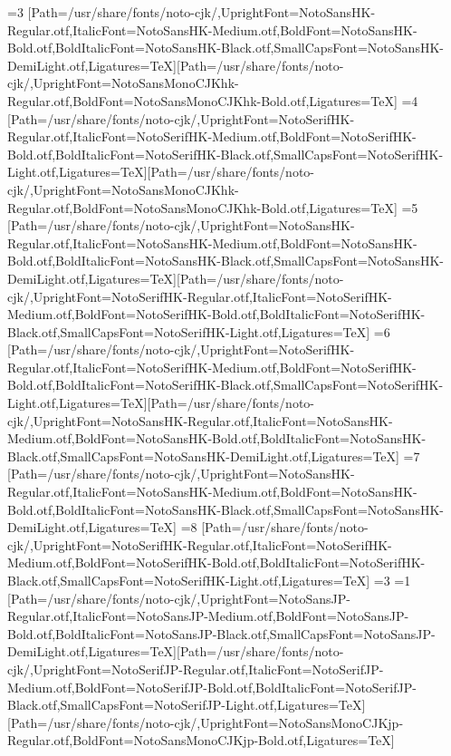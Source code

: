 \else\ifnum\value{CJKFonts}=3
[Path=/usr/share/fonts/noto-cjk/,UprightFont=NotoSansHK-Regular.otf,ItalicFont=NotoSansHK-Medium.otf,BoldFont=NotoSansHK-Bold.otf,BoldItalicFont=NotoSansHK-Black.otf,SmallCapsFont=NotoSansHK-DemiLight.otf,Ligatures=TeX][Path=/usr/share/fonts/noto-cjk/,UprightFont=NotoSansMonoCJKhk-Regular.otf,BoldFont=NotoSansMonoCJKhk-Bold.otf,Ligatures=TeX]
\else\ifnum\value{CJKFonts}=4
[Path=/usr/share/fonts/noto-cjk/,UprightFont=NotoSerifHK-Regular.otf,ItalicFont=NotoSerifHK-Medium.otf,BoldFont=NotoSerifHK-Bold.otf,BoldItalicFont=NotoSerifHK-Black.otf,SmallCapsFont=NotoSerifHK-Light.otf,Ligatures=TeX][Path=/usr/share/fonts/noto-cjk/,UprightFont=NotoSansMonoCJKhk-Regular.otf,BoldFont=NotoSansMonoCJKhk-Bold.otf,Ligatures=TeX]
\else\ifnum\value{CJKFonts}=5
[Path=/usr/share/fonts/noto-cjk/,UprightFont=NotoSansHK-Regular.otf,ItalicFont=NotoSansHK-Medium.otf,BoldFont=NotoSansHK-Bold.otf,BoldItalicFont=NotoSansHK-Black.otf,SmallCapsFont=NotoSansHK-DemiLight.otf,Ligatures=TeX][Path=/usr/share/fonts/noto-cjk/,UprightFont=NotoSerifHK-Regular.otf,ItalicFont=NotoSerifHK-Medium.otf,BoldFont=NotoSerifHK-Bold.otf,BoldItalicFont=NotoSerifHK-Black.otf,SmallCapsFont=NotoSerifHK-Light.otf,Ligatures=TeX]
\else\ifnum\value{CJKFonts}=6
[Path=/usr/share/fonts/noto-cjk/,UprightFont=NotoSerifHK-Regular.otf,ItalicFont=NotoSerifHK-Medium.otf,BoldFont=NotoSerifHK-Bold.otf,BoldItalicFont=NotoSerifHK-Black.otf,SmallCapsFont=NotoSerifHK-Light.otf,Ligatures=TeX][Path=/usr/share/fonts/noto-cjk/,UprightFont=NotoSansHK-Regular.otf,ItalicFont=NotoSansHK-Medium.otf,BoldFont=NotoSansHK-Bold.otf,BoldItalicFont=NotoSansHK-Black.otf,SmallCapsFont=NotoSansHK-DemiLight.otf,Ligatures=TeX]
\else\ifnum\value{CJKFonts}=7
[Path=/usr/share/fonts/noto-cjk/,UprightFont=NotoSansHK-Regular.otf,ItalicFont=NotoSansHK-Medium.otf,BoldFont=NotoSansHK-Bold.otf,BoldItalicFont=NotoSansHK-Black.otf,SmallCapsFont=NotoSansHK-DemiLight.otf,Ligatures=TeX]
\else\ifnum\value{CJKFonts}=8
[Path=/usr/share/fonts/noto-cjk/,UprightFont=NotoSerifHK-Regular.otf,ItalicFont=NotoSerifHK-Medium.otf,BoldFont=NotoSerifHK-Bold.otf,BoldItalicFont=NotoSerifHK-Black.otf,SmallCapsFont=NotoSerifHK-Light.otf,Ligatures=TeX]
\fi\fi\fi\fi\fi\fi\fi\fi\else
\ifnum\value{CJKLanguage}=3
\ifnum\value{CJKFonts}=1
[Path=/usr/share/fonts/noto-cjk/,UprightFont=NotoSansJP-Regular.otf,ItalicFont=NotoSansJP-Medium.otf,BoldFont=NotoSansJP-Bold.otf,BoldItalicFont=NotoSansJP-Black.otf,SmallCapsFont=NotoSansJP-DemiLight.otf,Ligatures=TeX][Path=/usr/share/fonts/noto-cjk/,UprightFont=NotoSerifJP-Regular.otf,ItalicFont=NotoSerifJP-Medium.otf,BoldFont=NotoSerifJP-Bold.otf,BoldItalicFont=NotoSerifJP-Black.otf,SmallCapsFont=NotoSerifJP-Light.otf,Ligatures=TeX][Path=/usr/share/fonts/noto-cjk/,UprightFont=NotoSansMonoCJKjp-Regular.otf,BoldFont=NotoSansMonoCJKjp-Bold.otf,Ligatures=TeX]
